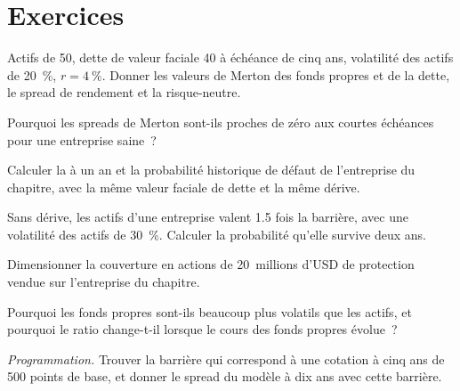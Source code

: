 \section{Exercices}

\begin{exercise}[$\star$]\label{exo:rc:structural-credit-models:1}
Actifs de 50, dette de valeur faciale 40 à échéance de cinq ans, volatilité des actifs de 20~\%, $r = 4~\%$. Donner les
valeurs de Merton des fonds propres et de la dette, le spread de rendement et la  risque-neutre.
\end{exercise}

\begin{exercise}[$\star$]\label{exo:rc:structural-credit-models:2}
Pourquoi les spreads de Merton sont-ils proches de zéro aux courtes échéances pour une entreprise saine~?
\end{exercise}

\begin{exercise}[$\star$]\label{exo:rc:structural-credit-models:3}
Calculer la  à un an et la probabilité historique de défaut de
l'entreprise du chapitre, avec la même valeur faciale de dette et la même dérive.
\end{exercise}

\begin{exercise}[$\star\star$]\label{exo:rc:structural-credit-models:4}
Sans dérive, les actifs d'une entreprise valent 1.5 fois la barrière, avec une volatilité des actifs de 30~\%.
Calculer la probabilité qu'elle survive deux ans.
\end{exercise}

\begin{exercise}[$\star\star$]\label{exo:rc:structural-credit-models:5}
Dimensionner la couverture en actions de 20~millions d'USD de protection vendue sur l'entreprise du chapitre.
\end{exercise}

\begin{exercise}[$\star\star$]\label{exo:rc:structural-credit-models:6}
Pourquoi les fonds propres sont-ils beaucoup plus volatils que les actifs, et pourquoi le ratio change-t-il lorsque le
cours des fonds propres évolue~?
\end{exercise}

\begin{exercise}[$\star\star\star$]\label{exo:rc:structural-credit-models:7}
\emph{Programmation.} Trouver la barrière qui correspond à une cotation à cinq ans de 500 points de base, et donner
le spread du modèle à dix ans avec cette barrière.
\end{exercise}

